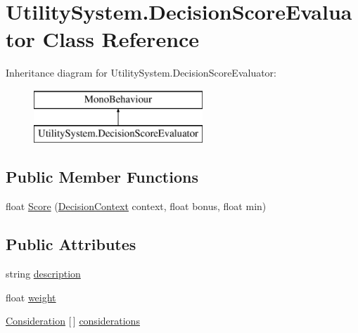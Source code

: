 \hypertarget{class_utility_system_1_1_decision_score_evaluator}{}\section{Utility\+System.\+Decision\+Score\+Evaluator Class Reference}
\label{class_utility_system_1_1_decision_score_evaluator}
Inheritance diagram for Utility\+System.\+Decision\+Score\+Evaluator\+:\begin{figure}[H]
\begin{center}
\leavevmode
\includegraphics[height=2.000000cm]{class_utility_system_1_1_decision_score_evaluator}
\end{center}
\end{figure}
\subsection*{Public Member Functions}
\begin{DoxyCompactItemize}
\item 
float \mbox{\hyperlink{class_utility_system_1_1_decision_score_evaluator_acf7ab6dfc85d63f780e632430a3cc991}{Score}} (\mbox{\hyperlink{class_utility_system_1_1_decision_context}{Decision\+Context}} context, float bonus, float min)
\end{DoxyCompactItemize}
\subsection*{Public Attributes}
\begin{DoxyCompactItemize}
\item 
string \mbox{\hyperlink{class_utility_system_1_1_decision_score_evaluator_aba9d231541a9c40addd46c83fccdd96b}{description}}
\item 
float \mbox{\hyperlink{class_utility_system_1_1_decision_score_evaluator_a606aa4ec017c2c0aa7e21cdcb8586f34}{weight}}
\item 
\mbox{\hyperlink{class_utility_system_1_1_consideration}{Consideration}} \mbox{[}$\,$\mbox{]} \mbox{\hyperlink{class_utility_system_1_1_decision_score_evaluator_a25c6bcf192097790a27891e542d7beb7}{considerations}}
\end{DoxyCompactItemize}
